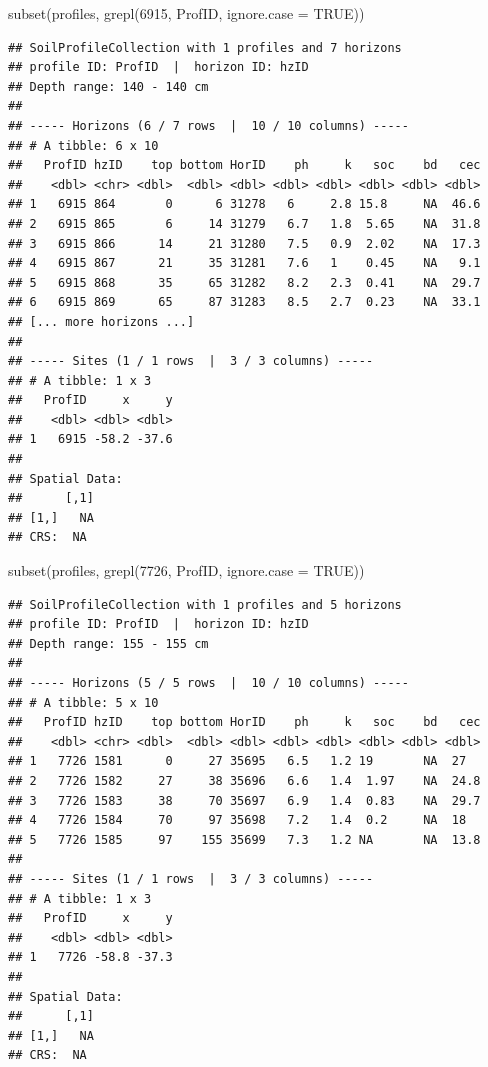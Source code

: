 \documentclass[
  10pt,
  b5paper,
  oneside]{book}
\newenvironment{Shaded}{\begin{snugshade}}{\end{snugshade}}
\newcommand{\AttributeTok}[1]{\textcolor[rgb]{0.77,0.63,0.00}{#1}}
\newcommand{\ConstantTok}[1]{\textcolor[rgb]{0.00,0.00,0.00}{#1}}
\newcommand{\DecValTok}[1]{\textcolor[rgb]{0.00,0.00,0.81}{#1}}
\newcommand{\FunctionTok}[1]{\textcolor[rgb]{0.00,0.00,0.00}{#1}}
\newcommand{\NormalTok}[1]{#1}
\begin{document}
\begin{Shaded}
\begin{Highlighting}[]
\FunctionTok{subset}\NormalTok{(profiles, }\FunctionTok{grepl}\NormalTok{(}\DecValTok{6915}\NormalTok{, ProfID, }\AttributeTok{ignore.case =} \ConstantTok{TRUE}\NormalTok{))}
\end{Highlighting}
\end{Shaded}

\begin{verbatim}
## SoilProfileCollection with 1 profiles and 7 horizons
## profile ID: ProfID  |  horizon ID: hzID 
## Depth range: 140 - 140 cm
## 
## ----- Horizons (6 / 7 rows  |  10 / 10 columns) -----
## # A tibble: 6 x 10
##   ProfID hzID    top bottom HorID    ph     k   soc    bd   cec
##    <dbl> <chr> <dbl>  <dbl> <dbl> <dbl> <dbl> <dbl> <dbl> <dbl>
## 1   6915 864       0      6 31278   6     2.8 15.8     NA  46.6
## 2   6915 865       6     14 31279   6.7   1.8  5.65    NA  31.8
## 3   6915 866      14     21 31280   7.5   0.9  2.02    NA  17.3
## 4   6915 867      21     35 31281   7.6   1    0.45    NA   9.1
## 5   6915 868      35     65 31282   8.2   2.3  0.41    NA  29.7
## 6   6915 869      65     87 31283   8.5   2.7  0.23    NA  33.1
## [... more horizons ...]
## 
## ----- Sites (1 / 1 rows  |  3 / 3 columns) -----
## # A tibble: 1 x 3
##   ProfID     x     y
##    <dbl> <dbl> <dbl>
## 1   6915 -58.2 -37.6
## 
## Spatial Data:
##      [,1]
## [1,]   NA
## CRS:  NA
\end{verbatim}

\begin{Shaded}
\begin{Highlighting}[]
\FunctionTok{subset}\NormalTok{(profiles, }\FunctionTok{grepl}\NormalTok{(}\DecValTok{7726}\NormalTok{, ProfID, }\AttributeTok{ignore.case =} \ConstantTok{TRUE}\NormalTok{))}
\end{Highlighting}
\end{Shaded}

\begin{verbatim}
## SoilProfileCollection with 1 profiles and 5 horizons
## profile ID: ProfID  |  horizon ID: hzID 
## Depth range: 155 - 155 cm
## 
## ----- Horizons (5 / 5 rows  |  10 / 10 columns) -----
## # A tibble: 5 x 10
##   ProfID hzID    top bottom HorID    ph     k   soc    bd   cec
##    <dbl> <chr> <dbl>  <dbl> <dbl> <dbl> <dbl> <dbl> <dbl> <dbl>
## 1   7726 1581      0     27 35695   6.5   1.2 19       NA  27  
## 2   7726 1582     27     38 35696   6.6   1.4  1.97    NA  24.8
## 3   7726 1583     38     70 35697   6.9   1.4  0.83    NA  29.7
## 4   7726 1584     70     97 35698   7.2   1.4  0.2     NA  18  
## 5   7726 1585     97    155 35699   7.3   1.2 NA       NA  13.8
## 
## ----- Sites (1 / 1 rows  |  3 / 3 columns) -----
## # A tibble: 1 x 3
##   ProfID     x     y
##    <dbl> <dbl> <dbl>
## 1   7726 -58.8 -37.3
## 
## Spatial Data:
##      [,1]
## [1,]   NA
## CRS:  NA
\end{verbatim}
\end{document}
